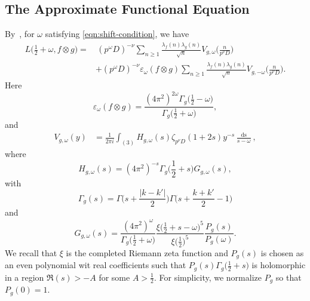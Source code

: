 \documentclass[12pt]{amsart}
\theoremstyle{plain}
\theoremstyle{definition}
\begin{document}

\subsection{The Approximate Functional Equation}
By~\cite[(4.9)]{KMV RS}, for $\omega$ satisfying \eqref{eqn:shift-condition}, we have
    \begin{equation}\label{eq:AF}
    \begin{split}
    L\Big(\frac12+\omega, f\otimes g\Big) 
    =&\, ( p^{ \omega} D)^{-\nu} \sum_{n\geq 1}  \frac{\lambda_f(n) \lambda_g(n)}{\sqrt n} 
    V_{g, \omega}\Big(\frac{n}{p^\nu D}\Big)
    \\
    &+( p^{ \omega} D)^{-\nu} \varepsilon_{\omega}(f \otimes g)
    \sum_{n\geq 1} 
    \frac{\lambda_f(n) \lambda_g(n)}{\sqrt n} 
    V_{g, -\omega}\Big(\frac{n}{p^\nu D}\Big).
    \end{split}
    \end{equation}
Here 
  \[
    \varepsilon_{\omega}(f \otimes g)
    = \frac{(4\pi^2)^{2\omega}\Gamma_g\big(\frac12-\omega\big)}{\Gamma_g\big(\frac12+\omega\big)},
    \] and 
    \begin{align}\label{eqn:V-g-omega}
    V_{g, \omega}(y)
    &= \frac{1}{2\pi i} \int_{(3)} H_{g, \omega}(s)
     \zeta_{p^\nu D} (1+2s)  y^{-s} \frac{\mathop{ds}}{s-\omega},    \end{align}
where 
    \[
    H_{g, \omega}(s)
    =(4\pi^2)^{-s} \Gamma_g\Big(\frac12+s\Big) G_{g, \omega}(s) ,
    \]
with
    \[
    \Gamma_g(s)= 
    \Gamma\Big(s+\frac{|k-k'|}{2}\Big)
    \Gamma\Big(s+\frac{k+k'}{2}-1\Big)
    \]
and
    \[
    G_{g, \omega}(s)=
    \frac{(4\pi^2)^{\omega}}{\Gamma_g\big(\frac12+\omega\big)}
    \frac{\xi\big(\frac12+s-\omega\big)^5}{\xi\big(\frac12\big)^5} \frac{P_g(s)}{P_g(\omega)} .
    \]
We recall that $\xi$ is the completed Riemann zeta function and $P_g(s)$ is chosen as an even polynomial wit real coefficients such that $P_g(s) \Gamma_g\big(\frac12+s\big)$ is holomorphic in a region $\Re(s) > -A$ for some $A>\frac12$. For simplicity, we normalize $P_g$ so that $P_g(0)=1$. 
\end{document}
